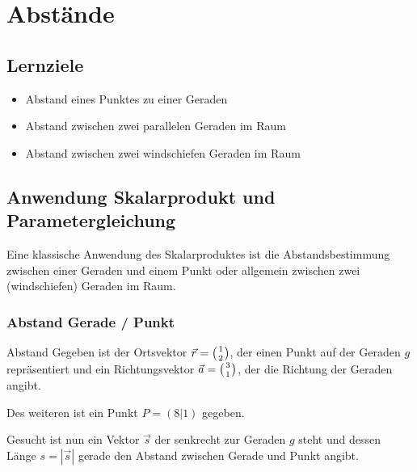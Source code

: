 \section{Abstände}

\subsection*{Lernziele}
\begin{itemize}
  \item Abstand eines Punktes zu einer Geraden
\item Abstand zwischen zwei parallelen Geraden im Raum
\item Abstand zwischen zwei windschiefen Geraden im Raum
\end{itemize}

\newpage

\subsection{Anwendung Skalarprodukt und Parametergleichung}

Eine klassische Anwendung des Skalarproduktes ist die
Abstandsbestimmung zwischen einer Geraden und einem Punkt oder
allgemein zwischen zwei (windschiefen) Geraden im Raum.
\newpage

\subsubsection{Abstand Gerade / Punkt}

\begin{beispiel}{Abstand}{}
Gegeben ist der Ortsvektor $\vec{r}=\left(1 \atop 2\right)$, der einen Punkt auf der
Geraden $g$ repräsentiert und ein Richtungsvektor
$\vec{a}=\left(3\atop 1\right)$, der
die Richtung der Geraden angibt.

Des weiteren ist ein Punkt $P=(8|1)$ gegeben.

Gesucht ist nun ein Vektor
$\vec{s}$ der senkrecht zur Geraden $g$ steht und dessen Länge
$s=|\vec{s}|$ gerade den Abstand zwischen Gerade und Punkt angibt.
\end{beispiel}

